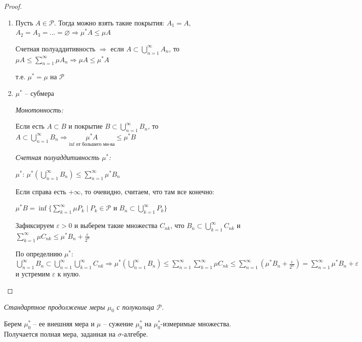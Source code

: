\begin{proof}~
    \begin{enumerate}
        \item Пусть $A\in\mathcal{P}$. Тогда можно взять такие покрытия: $A_1=A$, $A_2=A_3=...=\varnothing\Rightarrow \mu^* A\leq \mu A$
        
        Счетная полуаддитивность $\Rightarrow$ если $A\subset \bigcup\limits_{n=1}^\infty A_n$, 
        то $\mu A \leq \sum \limits_{n=1}^\infty \mu A_n\Rightarrow \mu A \leq \mu^* A$

        т.е. $\mu^* =\mu$ на $\mathcal{P}$

        \item $\mu^*$ – субмера 
        
        \textit{Монотонность:} 
        
        Если есть $A\subset B$ и покрытие $B\subset \bigcup\limits_{n=1}^\infty B_n$, то $A\subset \bigcup\limits_{n=1}^\infty B_n\Rightarrow
        \underset{\inf \text{ от большего мн-ва}}{\mu^* A} \leq \mu^*B$ 
        
        \textit{Счетная полуаддитивность $\mu^*$:} 
        
        $\mu^*$: $\mu^*(\bigcup\limits_{n=1}^\infty B_n)\leq \sum\limits_{n=1}^\infty \mu^* B_n$ 
        
        Если справа есть $+\infty$, то очевидно, считаем, что там все конечно:

        $\mu^* B =\inf \{\sum\limits_{k=1}^\infty \mu P_k\mid P_k\in \mathcal{P}\text{ и } B_n\subset \bigcup\limits_{k=1}^\infty P_k\}$

        Зафиксируем $\varepsilon > 0$ и выберем такие множества $C_{nk}$, что $B_n \subset \bigcup\limits_{k=1}^\infty C_{nk}$ и $\sum\limits_{k=1}^\infty \mu C_{nk}\leq \mu^* B_n +\frac{\varepsilon}{2^n}$

        По определнию $\mu^*$: $\bigcup\limits_{n=1}^\infty B_n\subset \bigcup\limits_{n=1}^\infty\bigcup\limits_{k=1}^\infty C_{nk}\Rightarrow 
        \mu^* (\bigcup\limits_{n=1}^\infty B_n)\leq \sum\limits_{n=1}^\infty\sum\limits_{k=1}^\infty \mu C_{nk}\leq
        \sum\limits_{n=1}^\infty (\mu^* B_n + \frac{\varepsilon}{2^n})=\sum\limits_{n=1}^\infty \mu^* B_n + \varepsilon$ и устремим $\varepsilon$ к нулю.
    \end{enumerate}
\end{proof}

\begin{definition}
    \textit{Стандартное продолжение меры $\mu_0$ с полукольца $\mathcal{P}$}.

    Берем $\mu_0^*$ – ее внешняя мера и $\mu$ – сужение $\mu_0^*$ на $\mu_0^*$-измеримые множества. 
    Получается полная мера, заданная на $\sigma$-алгебре.
\end{definition}

